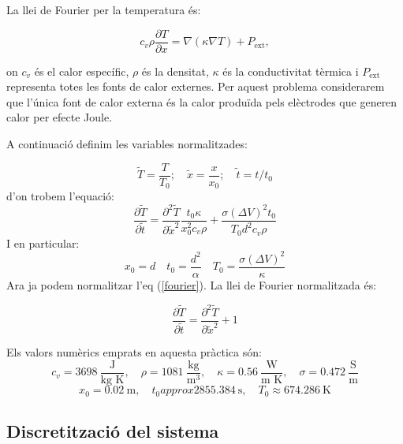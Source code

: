 \documentclass[a4paper,12pt,oneside]{article}
\begin{document}
La llei de Fourier per la temperatura és:

\begin{equation}
    c_v \rho \dfrac{\partial T}{\partial x} = \nabla (\kappa \nabla T) + P_{\text{ext}},
    \label{fourier}
\end{equation}

on $c_v$ és el calor específic, $\rho$ és la densitat, $\kappa$ és la conductivitat tèrmica i $P_{\text{ext}}$ representa totes 
les fonts de calor externes. Per aquest problema considerarem que l'única font de calor externa és la calor produïda pels 
elèctrodes que generen calor per efecte Joule.

A continuació definim les variables normalitzades:

\begin{equation}
    \widetilde{T}=\frac{T}{T_0};\quad \widetilde{x}=\frac{x}{x_0};\quad \widetilde{t}=t/t_0
    \label{norm}
\end{equation}
d'on trobem l'equació:
\begin{equation*}
    \frac{\partial \widetilde{T}}{\partial \widetilde{t}} = \frac{\partial^2 \widetilde{T}}{\partial \widetilde{x}^2}  
    \frac{t_0\kappa}{x_0^2c_v\rho}+\frac{\sigma (\Delta V)^2t_0}{T_0d^2c_v\rho}
\end{equation*}
I en particular:
 \begin{equation}
     x_0=d \quad t_0=\frac{d^2}{\alpha} \quad T_0=\frac{\sigma (\Delta V)^2}{\kappa}
\end{equation}
Ara ja podem normalitzar l'eq (\ref{fourier}). La llei de Fourier normalitzada és:

\begin{equation}
    \frac{\partial \widetilde{T}}{\partial \widetilde{t}}=\frac{\partial^2 \widetilde{T}}{\partial \widetilde{x}^2} + 1
\end{equation}

Els valors numèrics emprats en aquesta pràctica són: 
\begin{equation*}
    c_v = 3698 \ \frac{\text{J}}{\text{kg \ K}}, \quad \rho = 1081 \ \frac{\text{kg}}{\text{m} ^3}, \quad \kappa = 0.56 \ \frac{\text{W}}{\text{m \ K}}, \quad \sigma = 0.472 \ \frac{\text{S}}{\text{m}}
\end{equation*}
\begin{equation*}
    x_0 = 0.02 \ \text{m}, \quad t_0 approx 2855.384 \ \text{s}, \quad T_0 \approx 674.286 \ \text{K}
\end{equation*}

\subsection{Discretització del sistema}
\end{document}
